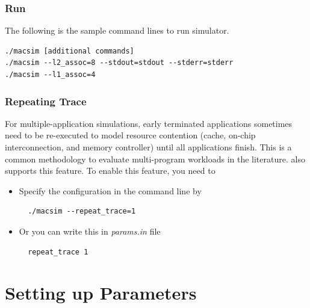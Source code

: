 \subsubsection{Run}

The following is the sample command lines to run \SIM simulator.

\begin{Verbatim}
./macsim [additional commands]
./macsim --l2_assoc=8 --stdout=stdout --stderr=stderr
./macsim --l1_assoc=4 
\end{Verbatim}


\subsubsection{Repeating Trace}

For multiple-application simulations, early terminated applications
sometimes need to be re-executed to model resource contention (cache,
on-chip interconnection, and memory controller) until all applications
finish. This is a common methodology to evaluate multi-program
workloads in the literature. \SIM also supports this feature. To
enable this feature, you need to

\begin{itemize}
  \item Specify the configuration in the command line by
  \begin{Verbatim}
  ./macsim --repeat_trace=1
  \end{Verbatim}

  \item Or you can write this in \textit{params.in} file
  \begin{Verbatim}
  repeat_trace 1
  \end{Verbatim}
\end{itemize}




\section{Setting up Parameters}
\label{sec:parameter}

